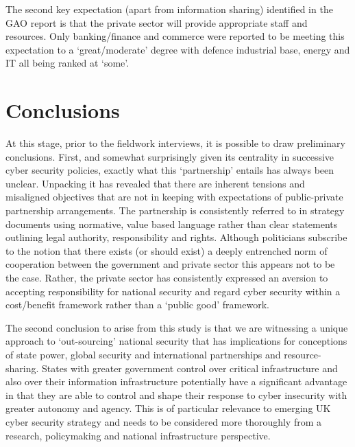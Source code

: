\documentclass[a4paper,11pt]{article}
\begin{document}
The second key expectation (apart from information sharing) identified
in the GAO report is that the private sector will provide appropriate
staff and resources. Only banking/finance and commerce were reported
to be meeting this expectation to a `great/moderate' degree with
defence industrial base, energy and IT all being ranked at `some'. 

\section{Conclusions}

At this stage, prior to the fieldwork interviews, it is possible to
draw preliminary conclusions. First, and somewhat surprisingly given
its centrality in successive cyber security policies, exactly what
this `partnership' entails has always been unclear.  Unpacking it has
revealed that there are inherent tensions and misaligned objectives
that are not in keeping with expectations of public-private
partnership arrangements. The partnership is consistently referred to
in strategy documents using normative, value based language rather
than clear statements outlining legal authority, responsibility and
rights. Although politicians subscribe to the notion that there exists
(or should exist) a deeply entrenched norm of cooperation between the
government and private sector this appears not to be the case. Rather,
the private sector has consistently expressed an aversion to accepting
responsibility for national security and regard cyber security within
a cost/benefit framework rather than a `public good' framework. 

The second conclusion to arise from this study is that we are
witnessing a unique approach to `out-sourcing' national security that
has implications for conceptions of state power, global security and
international partnerships and resource-sharing. States with greater
government control over critical infrastructure and also over their
information infrastructure potentially have a significant advantage in
that they are able to control and shape their response to cyber
insecurity with greater autonomy and agency. This is of particular
relevance to emerging UK cyber security strategy and needs to be
considered more thoroughly from a research, policymaking and national
infrastructure perspective.



\end{document}
